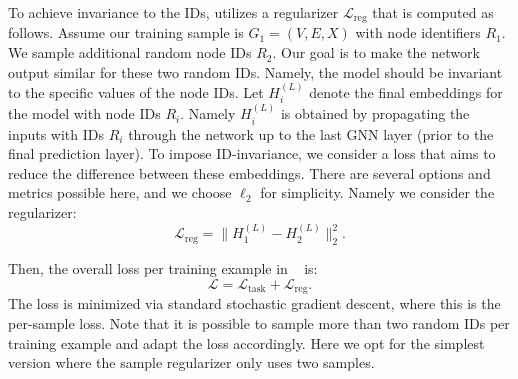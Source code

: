 To achieve invariance to the IDs, {\ourmethod} utilizes a regularizer 
$\mathcal{L}_{\text{reg}}$ that is computed as follows.
Assume our training sample is \( G_1 = (V, E, {X}) \) with node identifiers $R_1$. 
We sample additional random node IDs $R_2$. Our goal is to make the network
output similar for these two random IDs. Namely, the model should be invariant to the specific values of the node IDs. Let \( {H}_i^{(L)} \) denote the final embeddings for the model with node IDs $R_i$. Namely  \( {H}_i^{(L)} \) is obtained by propagating the inputs with IDs $R_i$ through the network up to the last GNN layer (prior to the final prediction layer).
 To impose ID-invariance, we consider a loss that aims to reduce the difference between these embeddings. There are several options and metrics possible here, and we choose $\ell_2$ for simplicity. Namely we consider the regularizer:
\begin{equation*}
\label{eq:residual_loss}\mathcal{L}_{\text{reg}} =  \|{H}_1^{(L)}- {H}_2^{(L)}\|_2^2.
\end{equation*}

Then, the overall loss per training example in \ourmethod~ is:
\begin{equation*}
    \mathcal{L} = \mathcal{L}_{\text{task}} +  \mathcal{L}_{\text{reg}}.
\end{equation*}
The loss is minimized via standard stochastic gradient descent, where this is the per-sample loss.
Note that it is possible to sample more than two random IDs per training example and adapt the loss accordingly. Here we opt for the simplest version where the sample regularizer only uses two samples.
